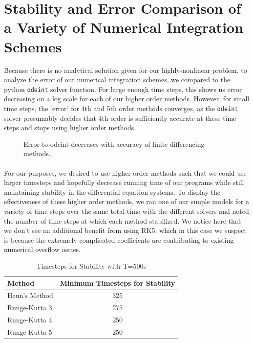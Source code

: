 \documentclass[12pt]{article}
\begin{document}
\section{Stability and Error Comparison of a Variety of Numerical Integration Schemes}
Because there is no analytical solution given for our highly-nonlinear problem, to analyze the error of our numerical integration schemes, we compared to the python \texttt{odeint} solver function. For large enough time steps, this shows us error decreasing on a log scale for each of our higher order methods. However, for small time steps, the `error` for 4th and 5th order methods converges, as the \texttt{odeint} solver presumably decides that 4th order is sufficiently accurate at these time steps and stops using higher order methods.\\
\begin{figure}[H]
  \centering
  \caption{Error to odeint decreases with accuracy of finite differencing methods.}
\end{figure}
\paragraph{}For our purposes, we desired to use higher order methods such that we could use larger timesteps and hopefully decrease running time of our programs while still maintaining stability in the differential equation systems. To display the effectiveness of these higher order methods, we ran one of our simple models for a variety of time steps over the same total time with the different solvers and noted the number of time steps at which each method stabilized. We notice here that we don't see an additional benefit from using RK5, which in this case we suspect is because the extremely complicated coefficients are contributing to existing numerical overflow issues.\\
\begin{table}[H]
\centering
\caption{Timesteps for Stability with T=500s}
\label{my-label}
\begin{tabular}{lc}
 Method &  Minimum Timesteps for Stability\\ \hline
 Heun's Method & 325 \\
 Runge-Kutta 3 &  275\\
 Runge-Kutta 4 &  250\\
 Runge-Kutta 5 & 250
\end{tabular}
\end{table}
\end{document}
